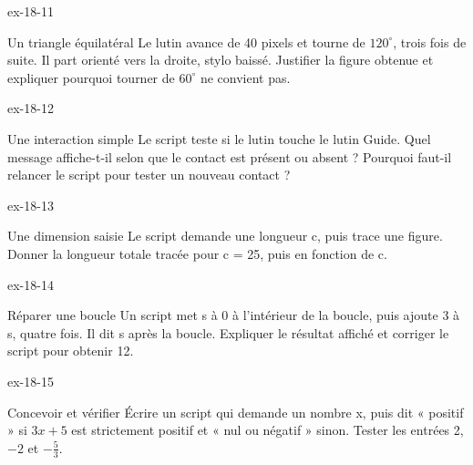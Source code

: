 \begin{blocLivre}{ex-18-11}\begin{exercice}[3]{Un triangle équilatéral}
Le lutin avance de 40 pixels et tourne de $120^\circ$, trois fois de suite. Il part orienté vers la droite, stylo baissé. Justifier la figure obtenue et expliquer pourquoi tourner de $60^\circ$ ne convient pas.
\label{fig-ex-18-11}
\end{exercice}\end{blocLivre}
\begin{blocLivre}{ex-18-12}\begin{exercice}[3]{Une interaction simple}
Le script teste si le lutin touche le lutin Guide. Quel message affiche-t-il selon que le contact est présent ou absent ? Pourquoi faut-il relancer le script pour tester un nouveau contact ?
\label{fig-ex-18-12}
\end{exercice}\end{blocLivre}
\begin{blocLivre}{ex-18-13}\begin{exercice}[3]{Une dimension saisie}
Le script demande une longueur c, puis trace une figure. Donner la longueur totale tracée pour c = 25, puis en fonction de c.
\label{fig-ex-18-13}
\end{exercice}\end{blocLivre}
\begin{blocLivre}{ex-18-14}\begin{exercice}[3]{Réparer une boucle}
Un script met s à 0 à l’intérieur de la boucle, puis ajoute 3 à s, quatre fois. Il dit s après la boucle. Expliquer le résultat affiché et corriger le script pour obtenir 12.
\label{fig-ex-18-14}
\end{exercice}\end{blocLivre}
\begin{blocLivre}{ex-18-15}\begin{exercice}[3]{Concevoir et vérifier}
Écrire un script qui demande un nombre x, puis dit « positif » si $3x+5$ est strictement positif et « nul ou négatif » sinon. Tester les entrées 2, $-2$ et $-\frac53$.
\label{fig-ex-18-15}
\end{exercice}\end{blocLivre}

\clearpage
